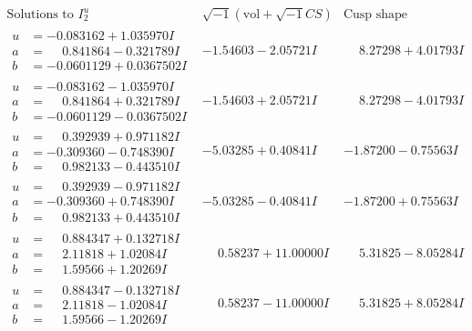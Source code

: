\documentclass[1p]{elsarticle_modified}
\theoremstyle{definition}
\newcommand{\I}{\sqrt{-1}}
\begin{document}
$$\begin{array}{c|c|c}  
\text{Solutions to }I^u_{2}& \I (\text{vol} + \sqrt{-1}CS) & \text{Cusp shape}\\
 \hline 
\begin{aligned}
u &= -0.083162 + 1.035970 I \\
a &= \phantom{-}0.841864 - 0.321789 I \\
b &= -0.0601129 + 0.0367502 I\end{aligned}
 & -1.54603 - 2.05721 I & \phantom{-}8.27298 + 4.01793 I \\ \hline\begin{aligned}
u &= -0.083162 - 1.035970 I \\
a &= \phantom{-}0.841864 + 0.321789 I \\
b &= -0.0601129 - 0.0367502 I\end{aligned}
 & -1.54603 + 2.05721 I & \phantom{-}8.27298 - 4.01793 I \\ \hline\begin{aligned}
u &= \phantom{-}0.392939 + 0.971182 I \\
a &= -0.309360 - 0.748390 I \\
b &= \phantom{-}0.982133 - 0.443510 I\end{aligned}
 & -5.03285 + 0.40841 I & -1.87200 - 0.75563 I \\ \hline\begin{aligned}
u &= \phantom{-}0.392939 - 0.971182 I \\
a &= -0.309360 + 0.748390 I \\
b &= \phantom{-}0.982133 + 0.443510 I\end{aligned}
 & -5.03285 - 0.40841 I & -1.87200 + 0.75563 I \\ \hline\begin{aligned}
u &= \phantom{-}0.884347 + 0.132718 I \\
a &= \phantom{-}2.11818 + 1.02084 I \\
b &= \phantom{-}1.59566 + 1.20269 I\end{aligned}
 & \phantom{-}0.58237 + 11.00000 I & \phantom{-}5.31825 - 8.05284 I \\ \hline\begin{aligned}
u &= \phantom{-}0.884347 - 0.132718 I \\
a &= \phantom{-}2.11818 - 1.02084 I \\
b &= \phantom{-}1.59566 - 1.20269 I\end{aligned}
 & \phantom{-}0.58237 - 11.00000 I & \phantom{-}5.31825 + 8.05284 I \\ \hline\begin{aligned}

\end{aligned}
\end{array}$$
\end{document}
